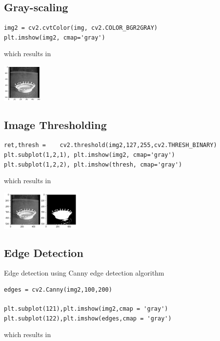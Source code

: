 \subsection{Gray-scaling}\label{gray-scaling}

\begin{verbatim}
img2 = cv2.cvtColor(img, cv2.COLOR_BGR2GRAY)
plt.imshow(img2, cmap='gray')
\end{verbatim}

which results in 

\includegraphics[width=0.15\textwidth]{opencv_files/output_11_1.png}


\subsection{Image Thresholding}\label{image-thresholding}

\begin{verbatim}
ret,thresh =    cv2.threshold(img2,127,255,cv2.THRESH_BINARY)
plt.subplot(1,2,1), plt.imshow(img2, cmap='gray')
plt.subplot(1,2,2), plt.imshow(thresh, cmap='gray')
\end{verbatim}

which results in 

\includegraphics[width=0.3\textwidth]{opencv_files/output_13_1.png}


\subsection{Edge Detection}\label{edge-detection}

Edge detection using Canny edge detection algorithm

\begin{verbatim}
edges = cv2.Canny(img2,100,200)

plt.subplot(121),plt.imshow(img2,cmap = 'gray')
plt.subplot(122),plt.imshow(edges,cmap = 'gray')
\end{verbatim}

which results in 

